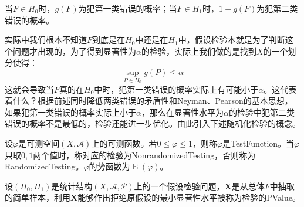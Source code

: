 \begin{note}
	当$F\in H_0$时，$g(F)$为犯第一类错误的概率；当$F\in H_1$时，$1-g(F)$为犯第二类错误的概率。\par
	实际中我们根本不知道$F$到底是在$H_0$中还是在$H_1$中，假设检验本就是为了判断这个问题才出现的，为了得到显著性为$\alpha$的检验，实际上我们做的是找到$X$的一个划分使得：
	\begin{equation*}
		\sup_{P\in H_0}g(P)\leqslant\alpha
	\end{equation*}
	这就会导致当$F$真的在$H_0$中时，犯第一类错误的概率实际上有可能小于$\alpha$。这代表着什么？根据前述同时降低两类错误的矛盾性和Neyman、Pearson的基本思想，如果犯第一类错误的概率实际上小于$\alpha$，那么在显著性水平为$\alpha$的检验中犯第二类错误的概率不是最低的，检验还能进一步优化。由此引入下述随机化检验的概念。
\end{note}
\begin{definition}
	设$\varphi$是可测空间$(X,\mathscr{A})$上的可测函数。若$0\leqslant\varphi\leqslant1$，则称$\varphi$是\gls{TestFunction}。当$\varphi$只取$0,1$两个值时，称对应的检验为\gls{NonrandomizedTesting}，否则称为\gls{RandomizedTesting}。$\varphi$的势函数为$\operatorname{E}(\varphi)$。
\end{definition}
\begin{definition}
	设$(H_0,H_1)$是统计结构$(X,\mathscr{A},\mathscr{P})$上的一个假设检验问题，$\mathbf{X}$是从总体$F$中抽取的简单样本，利用$\mathbf{X}$能够作出拒绝原假设的最小显著性水平被称为检验的\gls{PValue}。
\end{definition}

